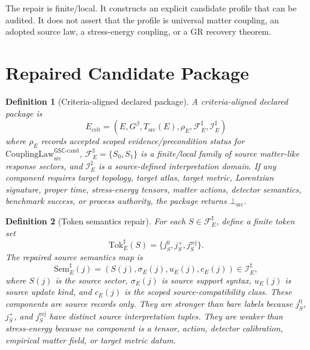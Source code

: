 \documentclass[11pt]{article}
\newcommand{\Gbeta}{G^\beta}
\newcommand{\CouplingLaw}{\mathrm{CouplingLaw}^{\mathsf{GSC}\mbox{-}\mathrm{cand}}_{\mathrm{src}}}
\newcommand{\BottomSrc}{\bot_{\mathrm{src}}}
\newcommand{\Tok}{\mathrm{Tok}}
\newcommand{\Sem}{\mathrm{Sem}}
\newcommand{\Fsrc}{\mathcal{F}_{E}^{\sharp}}
\newtheorem{definition}{Definition}
\begin{document}
The repair is finite/local. It constructs an explicit candidate profile that
can be audited. It does not assert that the profile is universal matter
coupling, an adopted source law, a stress-energy coupling, or a GR recovery
theorem.

\section{Repaired Candidate Package}

\begin{definition}[Criteria-aligned declared package]
A criteria-aligned declared package is
\[
  E_{\mathrm{crit}} =
  (E,\Gbeta,T_{\mathrm{src}}(E),\rho_E,\Fsrc,\mathcal{I}_E^{\sharp})
\]
where \(\rho_E\) records accepted scoped evidence/precondition status for
\(\CouplingLaw\), \(\Fsrc=\{S_0,S_1\}\) is a finite/local family of source
matter-like response sectors, and \(\mathcal{I}_E^{\sharp}\) is a
source-defined interpretation domain. If any component requires target
topology, target atlas, target metric, Lorentzian signature, proper time,
stress-energy tensors, matter actions, detector semantics, benchmark success,
or process authority, the package returns \(\BottomSrc\).
\end{definition}

\begin{definition}[Token semantics repair]
For each \(S\in\Fsrc\), define a finite token set
\[
  \Tok_E^{\sharp}(S)=
  \{j_S^{0},j_S^{+},j_S^{\mathrm{rej}}\}.
\]
The repaired source semantics map is
\[
  \Sem_E^{\sharp}(j)=
  (S(j),\sigma_E(j),u_E(j),c_E(j))
  \in \mathcal{I}_E^{\sharp},
\]
where \(S(j)\) is the source sector, \(\sigma_E(j)\) is source support
syntax, \(u_E(j)\) is source update kind, and \(c_E(j)\) is the scoped
source-compatibility class. These components are source records only. They are
stronger than bare labels because \(j_S^{0}\), \(j_S^{+}\), and
\(j_S^{\mathrm{rej}}\) have distinct source interpretation tuples. They are
weaker than stress-energy because no component is a tensor, action,
detector calibration, empirical matter field, or target metric datum.
\end{definition}
\end{document}
